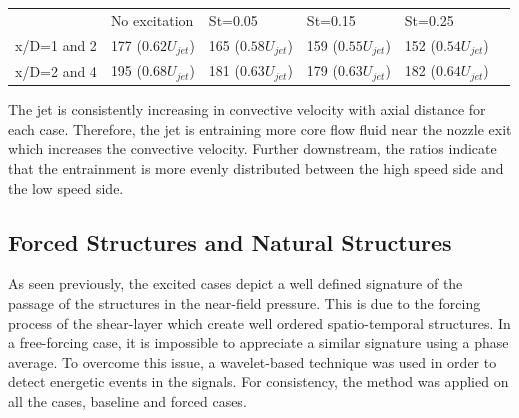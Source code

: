 \documentclass[english]{aiaa-tc}
\begin{document}
\begin{center}
	\begin{tabular}{|l|l|l|l|l|l}
		 & No excitation & St=0.05 & St=0.15 & St=0.25 \\
		x/D=1 and 2 & 177 ($0.62U_{jet}$) & 165 ($0.58U_{jet}$) & 159 ($0.55U_{jet}$) & 152 ($0.54U_{jet}$) \\
		x/D=2 and 4 & 195 ($0.68U_{jet}$) & 181 ($0.63U_{jet}$) & 179 ($0.63U_{jet}$) & 182 ($0.64U_{jet}$) \\
	\end{tabular}
	\label{tab:nearnozzleconvec}
\end{center}
The jet is consistently increasing in convective velocity with axial distance for each case.
Therefore, the jet is entraining more core flow fluid near the nozzle exit which increases the convective velocity. Further downstream, the ratios indicate that the entrainment is more evenly distributed between the high speed side and the low speed side.


\subsection{Forced Structures and Natural Structures}%
As seen previously, the excited cases depict a well defined signature of the passage of the structures in the near-field pressure. This is due to the forcing process of the shear-layer which create well ordered spatio-temporal structures. In a free-forcing case, it is impossible to appreciate a similar signature using a phase average. To overcome this issue, a wavelet-based technique was used in  order to detect energetic events in the signals. For consistency, the method was applied on all the cases, baseline and forced cases. 
\end{document}
